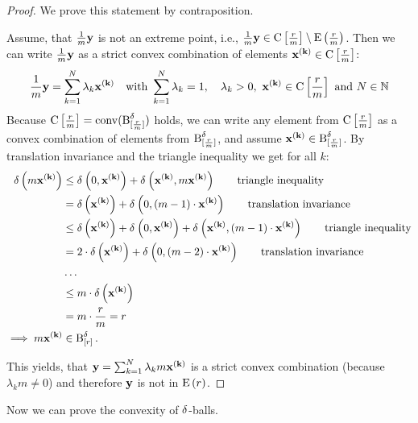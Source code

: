 \begin{proof}
	We prove this statement by contraposition.

  Assume, that $\frac{1}{m}\ve{y}$ is not an extreme point, i.e., $\frac{1}{m}\ve{y} \in \CO[\frac{\dis}{m}] \setminus \E[\frac{\dis}{m}]$.
  Then we can write $\frac{1}{m}\ve{y}$ as a strict convex combination of elements $\x \in \CO[\frac{\dis}{m}]$:
  $$\frac{1}{m}\ve{y} = \sum_{k=1}^N \lambda_k \x \quad \text{with } \sum_{k=1}^N \lambda_k = 1, \quad \lambda_k > 0,~ \x \in \CO[\frac{\dis}{m}] \text{ and } N \in \mathbb{N} $$
	Because $\CO[\frac{\dis}{m}] = \co(\cball{\frac{\dis}{m}})$ holds, we can write any element from $\CO[\frac{\dis}{m}]$ as a convex combination of elements from $\cball{\frac{\dis}{m}}$, and assume $\x \in \cball{\frac{\dis}{m}}$.
	By translation invariance and the triangle inequality we get for all $k$:
	\begin{align*}
		\metro{m \x}  & \leq \metr{0}{\x} + \metr{\x}{m \x} \tag*{\text{triangle inequality}}                       \\
		              & = \metro{\x} + \metr{0}{(m-1) \cdot  \x} \tag*{\text{translation invariance}}               \\
		              & \leq \metro{\x} + \metr{0}{\x} + \metr{\x}{(m-1)\cdot \x} \tag*{\text{triangle inequality}} \\
		              & = 2 \cdot \metro{\x} + \metr{0}{(m-2) \cdot \x} \tag*{\text{translation invariance}}        \\
		              & \dots                                                                                       \\
		              & \leq m \cdot \metro{\x}                                                                     \\
		              & = m \cdot \frac{\dis}{m} = \dis                                                         \\
		\implies m \x & \in \cball{\dis}.
	\end{align*}

  This yields, that $\ve{y} = \sum_{k=1}^{N} \lambda_k m \x$ is a strict convex combination (because $\lambda_k m \neq 0$) and therefore $\ve{y}$ is not in $\E$.
\end{proof}

Now we can prove the convexity of $\metric$-balls.

\newcommand\yy[1][i]{\ve{y^{(#1)}}}


